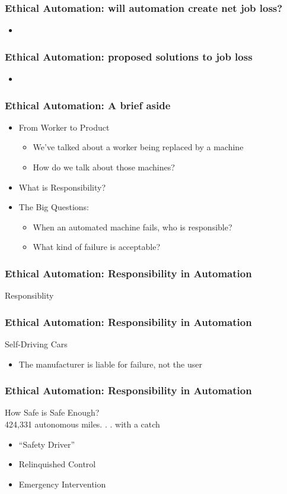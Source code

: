 \begin{frame}
  \frametitle{ Ethical Automation: will automation create net job loss?}
  \begin{itemize} 
  \item
  \end{itemize}
\end{frame}


\begin{frame}
  \frametitle{ Ethical Automation: proposed solutions to job loss}
  \begin{itemize}
  \item
  \end{itemize}
\end{frame}

\begin{frame}
  \frametitle{ Ethical Automation: A brief aside}
  \begin{itemize}
  \item From Worker to Product
    \begin{itemize}
    \item We've talked about a worker being replaced by a machine
    \item How do we talk about those machines?
    \end{itemize}
  \item What is Responsibility?
  \item The Big Questions:
    \begin{itemize}
    \item When an automated machine fails, who is responsible?
    \item What kind of failure is acceptable?
    \end{itemize}
  \end{itemize}
\end{frame}


\begin{frame}
  \frametitle{ Ethical Automation: Responsibility in Automation}
  \Large{Responsiblity}
\end{frame}


\begin{frame}
  \frametitle{ Ethical Automation: Responsibility in Automation}
  {\Large Self-Driving Cars}
  \begin{itemize}
  \item The manufacturer is liable for failure, not the user
  \end{itemize}
\end{frame}


\begin{frame}
  \frametitle{ Ethical Automation: Responsibility in Automation}
  {\Large How Safe is Safe Enough?}\\
  424,331 autonomous miles. . . with a catch
  \begin{itemize}
  \item ``Safety Driver''
  \item Relinquished Control
  \item Emergency Intervention
  \end{itemize}
\end{frame}


